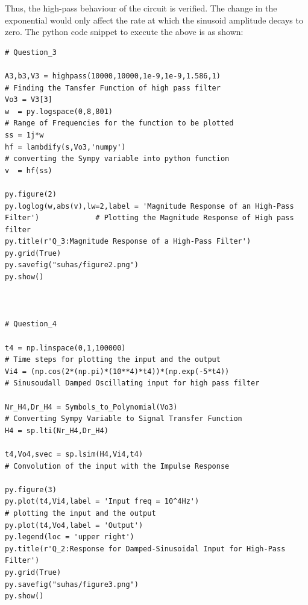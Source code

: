 \documentclass[11pt, a4paper]{article}
\begin{document}
   Thus, the high-pass behaviour of the circuit is verified.  The change in the exponential would only affect the rate at which the sinusoid amplitude decays to zero.
The python code snippet to execute the above is as shown:
\begin{verbatim}
# Question_3

A3,b3,V3 = highpass(10000,10000,1e-9,1e-9,1.586,1)                                       # Finding the Tansfer Function of high pass filter 
Vo3 = V3[3]
w  = py.logspace(0,8,801)                                                                # Range of Frequencies for the function to be plotted
ss = 1j*w
hf = lambdify(s,Vo3,'numpy')                                                             # converting the Sympy variable into python function
v  = hf(ss)

py.figure(2)
py.loglog(w,abs(v),lw=2,label = 'Magnitude Response of an High-Pass Filter')             # Plotting the Magnitude Response of High pass filter
py.title(r'Q_3:Magnitude Response of a High-Pass Filter')
py.grid(True)
py.savefig("suhas/figure2.png")
py.show()



# Question_4

t4 = np.linspace(0,1,100000)                                                             # Time steps for plotting the input and the output
Vi4 = (np.cos(2*(np.pi)*(10**4)*t4))*(np.exp(-5*t4))                                     # Sinusoudall Damped Oscillating input for high pass filter

Nr_H4,Dr_H4 = Symbols_to_Polynomial(Vo3)                                                 # Converting Sympy Variable to Signal Transfer Function
H4 = sp.lti(Nr_H4,Dr_H4)

t4,Vo4,svec = sp.lsim(H4,Vi4,t4)                                                         # Convolution of the input with the Impulse Response

py.figure(3) 
py.plot(t4,Vi4,label = 'Input freq = 10^4Hz')                                            # plotting the input and the output  
py.plot(t4,Vo4,label = 'Output')
py.legend(loc = 'upper right')
py.title(r'Q_2:Response for Damped-Sinusoidal Input for High-Pass Filter')
py.grid(True)
py.savefig("suhas/figure3.png")
py.show()
\end{verbatim}
\end{document}
